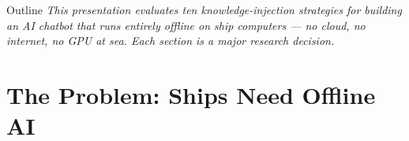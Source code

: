 \documentclass[aspectratio=169,11pt]{beamer}
\begin{document}
\begin{frame}[shrink=15]{Outline}
  \vspace{2pt}
  {\small\color{slate}\itshape
    This presentation evaluates ten knowledge-injection strategies for
    building an AI chatbot that runs entirely offline on ship computers --- no
    cloud, no internet, no GPU at sea.  Each section is a major research decision.}
  \vspace{6pt}
  \tableofcontents[hideallsubsections]
\end{frame}

\section{The Problem: Ships Need Offline AI}
\end{document}
